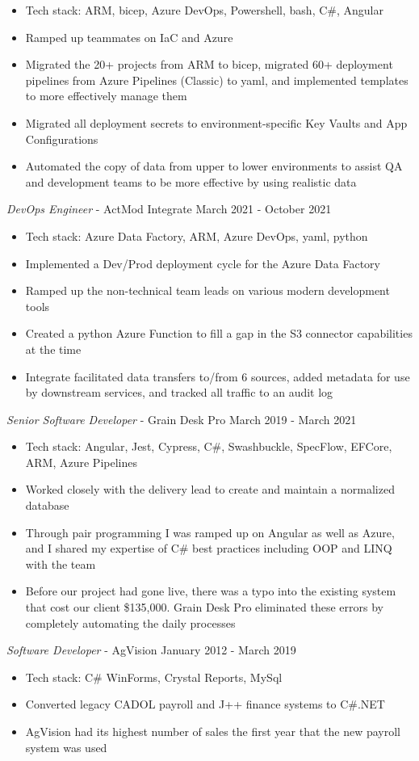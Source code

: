 \documentclass[line,margin]{res}
\begin{document}
\begin{resume}
	\begin{itemize}
		\item Tech stack: ARM, bicep, Azure DevOps, Powershell, bash, C\#, Angular
		\item Ramped up teammates on IaC and Azure
		\item Migrated the 20+ projects from ARM to bicep, 
			migrated 60+ deployment pipelines from Azure Pipelines (Classic) to yaml, 
			and implemented templates to more effectively manage them
		\item Migrated all deployment secrets to environment-specific Key Vaults and App Configurations
		\item Automated the copy of data from upper to lower environments to assist QA and development teams to be more effective by using realistic data
	\end{itemize} 
	{\sl DevOps Engineer} - ActMod Integrate \hfill March 2021 - October 2021
	\begin{itemize}
		\item Tech stack: Azure Data Factory, ARM, Azure DevOps, yaml, python
		\item Implemented a Dev/Prod deployment cycle for the Azure Data Factory
		\item Ramped up the non-technical team leads on various modern development tools
		\item Created a python Azure Function to fill a gap in the S3 connector capabilities at the time
		\item Integrate facilitated data transfers to/from 6 sources, added metadata for use by downstream services, 
			and tracked all traffic to an audit log
	\end{itemize}
	{\sl Senior Software Developer} - Grain Desk Pro \hfill March 2019 - March 2021
	\begin{itemize}
		\item Tech stack: Angular, Jest, Cypress, C\#, Swashbuckle, SpecFlow, EFCore, ARM, Azure Pipelines
		\item Worked closely with the delivery lead to create and maintain a normalized database
		\item Through pair programming I was ramped up on Angular as well as Azure, 
			and I shared my expertise of C\# best practices including OOP and LINQ with the team
		\item Before our project had gone live, there was a typo into the existing system that cost our client \$135,000. 
			Grain Desk Pro eliminated these errors by completely automating the daily processes 
	\end{itemize}
	{\sl Software Developer} - AgVision \hfill January 2012 - March 2019
	\begin{itemize} 
		\item Tech stack: C\# WinForms, Crystal Reports, MySql
		\item Converted legacy CADOL payroll and J++ finance systems to C\#.NET
		\item AgVision had its highest number of sales the first year that the new payroll system was used
	\end{itemize}
           

\end{resume}
\end{document}
